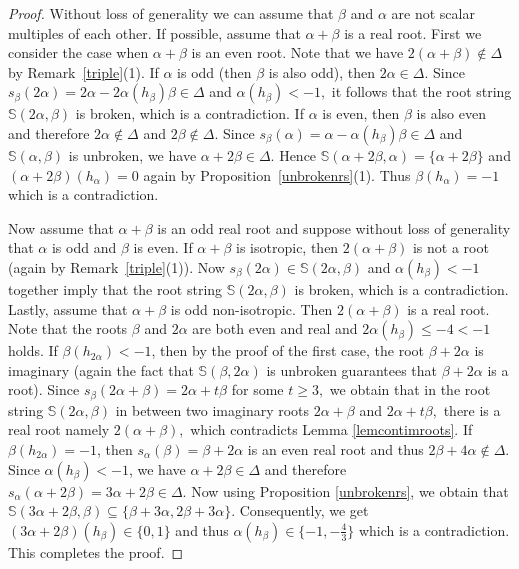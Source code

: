 \documentclass[11pt,reqno]{amsart}
\theoremstyle{plain}
\theoremstyle{definition}
\theoremstyle{remark}
\numberwithin{equation}{section}
\begin{document}
\begin{proof}
Without loss of generality we can assume that $\beta$ and $\alpha$ are not scalar multiples of each other. If possible, assume that $\alpha+\beta$ is a real root. First we consider the case when $\alpha+\beta$ is an even root. Note that we have  $2(\alpha+\beta)\notin \Delta$ by Remark~\ref{triple}(1). If $\alpha$ is odd (then $\beta$ is also odd), then $2\alpha\in \Delta.$ Since $s_\beta(2\alpha)=2\alpha-2\alpha(h_\beta)\beta\in \Delta$ and $\alpha(h_\beta)<-1,$ it follows that the root string $\mathbb{S}(2\alpha,\beta)$ is broken, which is a contradiction. If $\alpha$ is even, then $\beta$ is also even and therefore $2\alpha\notin \Delta$ and $2\beta\notin \Delta.$ Since $s_\beta(\alpha)=\alpha-\alpha(h_\beta)\beta\in \Delta$ and $\mathbb{S}(\alpha,\beta)$ is unbroken, we have $\alpha+2\beta\in \Delta$. Hence $\mathbb{S}(\alpha+2\beta,\alpha)=\{\alpha+2\beta\}$ and $(\alpha+2\beta)(h_\alpha)=0$ again by Proposition~\ref{unbrokenrs}(1). Thus $\beta(h_\alpha)=-1$ which is a contradiction. 

Now assume that $\alpha+\beta$ is an odd real root and suppose without loss of generality that $\alpha$ is odd and $\beta$ is even. If $\alpha+\beta$ is isotropic, then $2(\alpha+\beta)$ is not a root (again by Remark~\ref{triple}(1)). Now $s_\beta(2\alpha)\in\mathbb{S}(2\alpha,\beta)$ and $\alpha(h_\beta)<-1$ together imply that the root string $\mathbb{S}(2\alpha,\beta)$ is broken, which is a contradiction. Lastly, assume that $\alpha+\beta$ is odd non-isotropic. Then $2(\alpha+\beta)$ is a real root. Note that the roots $\beta$ and $2\alpha$ are both even and real and $2\alpha(h_\beta)\leq -4<-1$ holds. If $\beta(h_{2\alpha})<-1$, then by the proof of the first case, the root $\beta+2\alpha$ is imaginary (again the fact that $\mathbb{S}(\beta,2\alpha)$ is unbroken guarantees that $\beta+2\alpha$ is a root). Since $s_\beta(2\alpha+\beta)=2\alpha+t\beta$ for some $t\geq 3,$ we obtain that in the root string $\mathbb{S}(2\alpha,\beta)$ in between two imaginary roots $2\alpha+\beta$ and $2\alpha+t\beta,$ there is a real root namely $2(\alpha+\beta),$ which contradicts Lemma \ref{lemcontimroots}. If $\beta(h_{2\alpha})=-1$, then $s_\alpha(\beta)=\beta+2\alpha$ is an even real root and thus $2\beta+4\alpha\notin \Delta.$ Since $\alpha(h_\beta)<-1$, we have $\alpha+2\beta\in\Delta$ and therefore $s_\alpha(\alpha+2\beta)=3\alpha+2\beta\in\Delta.$ Now using Proposition \ref{unbrokenrs}, we obtain that $\mathbb{S}(3\alpha+2\beta,\beta)\subseteq \{\beta+3\alpha,2\beta+3\alpha\}$. Consequently, we get $(3\alpha+2\beta)(h_\beta)\in\{0,1\}$ and thus $\alpha(h_\beta)\in \{-1,-\frac{4}{3}\}$ which is a contradiction. This completes the proof.
\end{proof}
\end{document}
